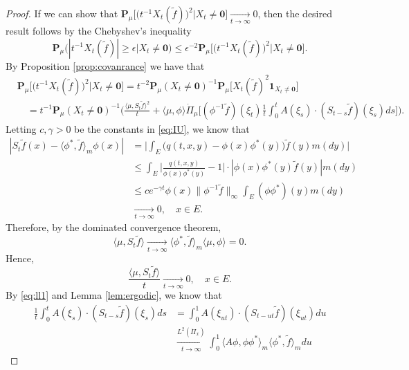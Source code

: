 \documentclass[UTF8]{pkuthss}
\theoremstyle{plain}
\theoremstyle{definition}
\numberwithin{equation}{section}
\begin{document}
\begin{proof}
	If we can show that $\mathbf P_\mu\big[\big(t^{-1}X_t(\tilde f)\big)^2|X_t \neq \mathbf 0\big]\xrightarrow[t\to\infty]{} 0$, then the desired result follows by the Chebyshev's inequality
\[
	\mathbf P_\mu \big( | t^{-1} X_t(\tilde f) | \geq \epsilon \big | X_t \neq \mathbf 0\big)
	\leq \epsilon^{-2}\mathbf P_\mu \big[ \big(t^{-1} X_t(\tilde f)\big)^2 \big | X_t \neq \mathbf 0 \big].
\]
	By Proposition \ref{prop:covanrance} we have that
\begin{align}\label{eq:general-lemma-1}
	&\mathbf P_\mu\big[\big(t^{-1}X_t(\tilde f)\big)^2\big|X_t \neq \mathbf 0\big]
	= t^{-2} \mathbf P_\mu (X_t\neq \mathbf 0)^{-1}\mathbf P_\mu\big[X_t(\tilde f)^2\mathbf 1_{X_t\neq \mathbf 0}\big] \\
	&\quad= t^{-1} \mathbf P_\mu (X_t\neq \mathbf 0)^{-1} \Big(\frac{\langle \mu,S_t\tilde f\rangle^2}{t} + \langle \mu,\phi \rangle\dot{\Pi}_{\mu}\big[(\phi^{-1}\tilde f)(\xi_t)\frac{1}{t}
	\int_0^t A(\xi_s)\cdot (S_{t-s} \tilde f)(\xi_s)ds\big]\Big).
\end{align}
	Letting $c,\gamma > 0$ be the constants in \eqref{eq:IU}, we know that
\begin{align}\label{eq:ll1}
	| S_t\tilde f (x) - \langle \phi^* , \tilde f \rangle_m \phi(x)|
	&= \Big | \int_{E} \big(q(t,x,y) - \phi(x)\phi^*(y)\big) \tilde f (y) m(dy) \Big | \\
	&\leq \int_{E} \big|\frac{q(t,x,y)}{\phi(x)\phi^*(y)} - 1 \big| \cdot |\phi(x)\phi^*(y) \tilde f (y) | m(dy) \\
	& \leq ce^{-\gamma t} \phi(x) \|\phi^{-1}\tilde f\|_\infty \int_{E} (\phi\phi^*)(y) m(dy)\\
	& \xrightarrow[t\to\infty]{} 0,
	\quad x\in E.
\end{align}
Therefore, by the dominated convergence theorem,
\[
	\langle \mu,S_t\tilde f\rangle
	\xrightarrow[t\to \infty]{} \langle \phi^*, \tilde f\rangle_m\langle \mu, \phi\rangle
	= 0.
\]
	Hence,	
\begin{equation}\label{eq:S_t}
	\frac{ \langle \mu,S_t\tilde f\rangle}{t}
	\xrightarrow [t\to\infty]{} 0,
	\quad x\in E.
\end{equation}
	By \eqref{eq:ll1} and Lemma \ref{lem:ergodic}, we know that
\begin{align}
\frac{1}{t}\int_0^t A(\xi_s) \cdot (S_{t-s} \tilde f)(\xi_s)ds
	&= \int_0^1 A(\xi_{ut})\cdot (S_{t-ut} \tilde f)(\xi_{ut})d{u}\\
    &\xrightarrow[t\to\infty]{L^2(\dot{\Pi}_x)} \int_0^1\langle A\phi,\phi\phi^*\rangle_m \langle\phi^*,\tilde f\rangle_m du

\end{align}
\end{proof}
\end{document}
